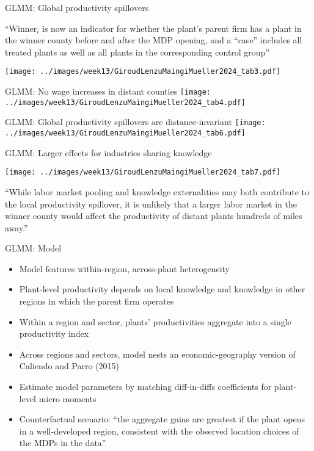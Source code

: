 \documentclass[11pt,notes=hide,aspectratio=169]{beamer}
\begin{document}
\begin{frame}{GLMM: Global productivity spillovers}
{\footnotesize ``$\text{Winner}_{i}$ is now an indicator for whether the plant's parent firm has a plant in the winner county before and after the MDP opening, and a ``case'' includes all treated plants as well as all plants in the corresponding control group''\par}
\vspace{-3mm}
\begin{center}
\texttt{[image: ../images/week13/GiroudLenzuMaingiMueller2024\_tab3.pdf]}
\end{center}
\end{frame}
\begin{frame}{GLMM: No wage increases in distant counties}
\texttt{[image: ../images/week13/GiroudLenzuMaingiMueller2024\_tab4.pdf]}
	
\end{frame}
\begin{frame}{GLMM: Global productivity spillovers are distance-invariant}
\texttt{[image: ../images/week13/GiroudLenzuMaingiMueller2024\_tab6.pdf]}
\end{frame}
\begin{frame}{GLMM: Larger effects for industries sharing knowledge}
\begin{center}
\texttt{[image: ../images/week13/GiroudLenzuMaingiMueller2024\_tab7.pdf]}
\end{center}
\vspace{-2mm}
{\footnotesize ``While labor market pooling and knowledge externalities may both contribute to the local productivity spillover, it is unlikely that a larger labor market in the winner county would affect the productivity of distant plants hundreds of miles away.''\par}
\end{frame}
\begin{frame}{GLMM: Model}
\begin{itemize}
\item Model features within-region, across-plant heterogeneity
\item Plant-level productivity depends on local knowledge and knowledge in other regions in which the parent firm operates
\item Within a region and sector, plants' productivities aggregate into a single productivity index
\item Across regions and sectors, model nests an economic-geography version of Caliendo and Parro (2015)
\item Estimate model parameters by matching diff-in-diffs coefficients for plant-level micro moments
\item Counterfactual scenario: ``the aggregate gains are greatest if the plant opens in a well-developed region, consistent with the observed location choices of the MDPs in the data''
\end{itemize}
\end{frame}
\end{document}
